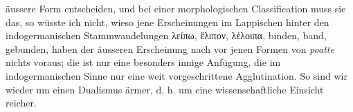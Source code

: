   äussere Form entscheiden, und bei einer morphologischen Classification muss sie das, so wüsste ich nicht, wieso jene Erscheinungen im Lappischen hinter den indogermanischen Stammwandelungen  λείπω, ἔλιπον, λέλοιπα, binden, band, gebunden, haben der äusseren Erscheinung nach vor jenen Formen von \textit{poatte} nichts voraus; die  ist nur eine besonders innige Anfügung, die  im indogermanischen Sinne nur eine weit vorgeschrittene Agglutination. So \label{fp.334} sind wir wieder um einen Dualismus ärmer, d. h. um eine wissenschaftliche Einsicht reicher.

